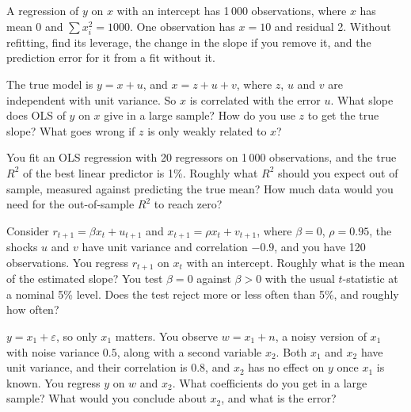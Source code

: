 \begin{question}\label{iq:iv1:regression:26}
A regression of $y$ on $x$ with an intercept has 1\,000 observations, where $x$ has mean 0 and $\sum x_i^2 = 1000$. One observation has $x = 10$ and residual 2. Without refitting, find its leverage, the change in the slope if you remove it, and the prediction error for it from a fit without it.
\end{question}

\begin{question}\label{iq:iv1:regression:27}
The true model is $y = x + u$, and $x = z + u + v$, where $z$, $u$ and $v$ are independent with unit variance. So $x$ is correlated with the error $u$. What slope does OLS of $y$ on $x$ give in a large sample? How do you use $z$ to get the true slope? What goes wrong if $z$ is only weakly related to $x$?
\end{question}

\begin{question}\label{iq:iv1:regression:28}
You fit an OLS regression with 20 regressors on 1\,000 observations, and the true $R^2$ of the best linear predictor is 1\%. Roughly what $R^2$ should you expect out of sample, measured against predicting the true mean? How much data would you need for the out-of-sample $R^2$ to reach zero?
\end{question}

\begin{question}\label{iq:iv1:regression:29}
Consider $r_{t+1} = \beta x_t + u_{t+1}$ and $x_{t+1} = \rho x_t + v_{t+1}$, where $\beta = 0$, $\rho = 0.95$, the shocks $u$ and $v$ have unit variance and correlation $-0.9$, and you have 120 observations. You regress $r_{t+1}$ on $x_t$ with an intercept. Roughly what is the mean of the estimated slope? You test $\beta = 0$ against $\beta > 0$ with the usual $t$-statistic at a nominal 5\% level. Does the test reject more or less often than 5\%, and roughly how often?
\end{question}

\begin{question}\label{iq:iv1:regression:30}
$y = x_1 + \varepsilon$, so only $x_1$ matters. You observe $w = x_1 + n$, a noisy version of $x_1$ with noise variance $0.5$, along with a second variable $x_2$. Both $x_1$ and $x_2$ have unit variance, and their correlation is $0.8$, and $x_2$ has no effect on $y$ once $x_1$ is known. You regress $y$ on $w$ and $x_2$. What coefficients do you get in a large sample? What would you conclude about $x_2$, and what is the error?
\end{question}
